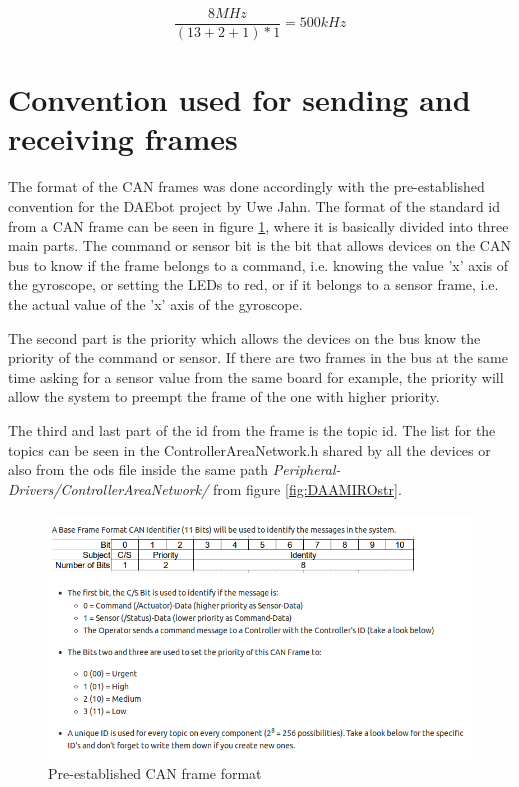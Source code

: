 \documentclass[12pt]{report}%
\begin{document}
\begin{equation} \label{eq:baudrate2}
	\frac{8MHz}{(13+2+1)*1} = 500kHz
\end{equation}

\section{Convention used for sending and receiving frames}
\label{sec:canconv}

The format of the CAN frames was done accordingly with the pre-established convention for the DAEbot project \cite{DAEbot_Wiki} by Uwe Jahn. The format of the standard id from a CAN frame can be seen in figure \ref{fig:can}, where it is basically divided into three main parts. The command or sensor bit is the bit that allows devices on the CAN bus to know if the frame belongs to a command, i.e. knowing the value 'x' axis of the gyroscope, or setting the LEDs to red, or if it belongs to a sensor frame, i.e. the actual value of the 'x' axis of the gyroscope.

The second part is the priority which allows the devices on the bus know the priority of the command or sensor. If there are two frames in the bus at the same time asking for a sensor value from the same board for example, the priority will allow the system to preempt the frame of the one with higher priority.

The third and last part of the id from the frame is the topic id. The list for the topics can be seen in the ControllerAreaNetwork.h shared by all the devices or also from the ods file inside the same path \textit{Peripheral-Drivers/ControllerAreaNetwork/} from figure \ref{fig:DAAMIROstr}.

\begin{figure}[ht]
	\centering
	\includegraphics[width=\textwidth]{can_structure}
    \caption{Pre-established CAN frame format \cite{DAEbot_Wiki}}
    \label{fig:can}
\end{figure}
\end{document}
